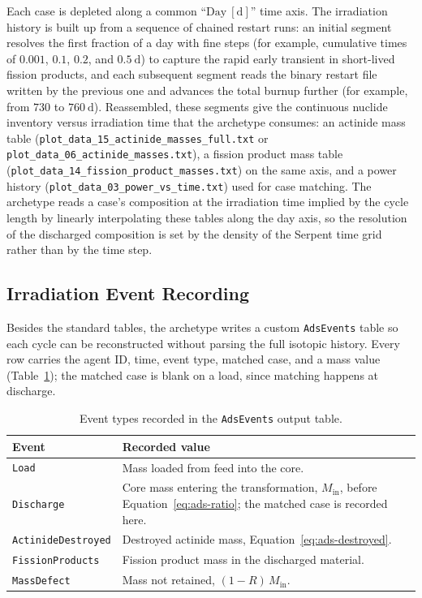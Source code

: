 Each case is depleted along a common ``\(\mathrm{Day}~[\mathrm{d}]\)'' time axis.
The irradiation history is built up from a sequence of chained restart runs: an
initial segment resolves the first fraction of a day with fine steps (for
example, cumulative times of \(0.001\), \(0.1\), \(0.2\), and
\(0.5~\mathrm{d}\)) to capture the rapid early transient in short-lived
fission products, and each subsequent segment reads the binary restart file
written by the previous one and advances the total burnup further (for example,
from \(730\) to \(760~\mathrm{d}\)). Reassembled, these segments give the
continuous nuclide inventory versus irradiation time that the archetype consumes:
an actinide mass table (\texttt{plot\_data\_15\_actinide\_masses\_full.txt} or
\texttt{plot\_data\_06\_actinide\_masses.txt}), a fission product mass table
(\texttt{plot\_data\_14\_fission\_product\_masses.txt}) on the same axis, and a
power history (\texttt{plot\_data\_03\_power\_vs\_time.txt}) used for case
matching. The archetype reads a case's composition at the irradiation time
implied by the cycle length by linearly interpolating these tables along the
day axis, so the resolution of the discharged composition is set by the density
of the Serpent time grid rather than by the \Cyclus time step.

\subsection{Irradiation Event Recording}
\label{subsec:ads-events}

Besides the standard \Cyclus tables, the archetype writes a custom
\texttt{AdsEvents} table so each cycle can be reconstructed without parsing the
full isotopic history. Every row carries the agent ID, time, event type, matched
case, and a mass value (Table~\ref{tab:ads-events}); the matched case is blank on
a load, since matching happens at discharge.

\begin{table}[h!]
    \centering
    \caption{Event types recorded in the \texttt{AdsEvents} output table.}
    \label{tab:ads-events}
    \begin{tabular}{p{} p{}}
        \toprule
        \textbf{Event} & \textbf{Recorded value} \\
        \midrule
        \texttt{Load} & Mass loaded from feed into the core. \\
        \texttt{Discharge} & Core mass entering the transformation,
                             $M_{\mathrm{in}}$, before Equation~\ref{eq:ads-ratio};
                             the matched case is recorded here. \\
        \texttt{ActinideDestroyed} & Destroyed actinide mass,
                             Equation~\ref{eq:ads-destroyed}. \\
        \texttt{FissionProducts} & Fission product mass in the discharged material. \\
        \texttt{MassDefect} & Mass not retained, $(1-R)\,M_{\mathrm{in}}$. \\
        \bottomrule
    \end{tabular}
\end{table}

